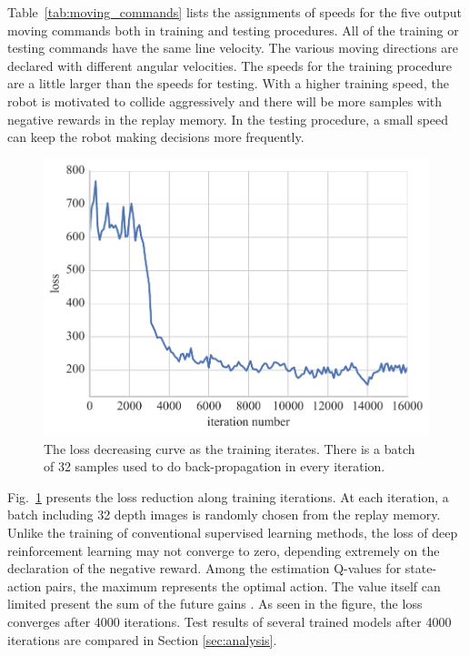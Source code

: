 Table~\ref{tab:moving_commands} lists the assignments of speeds for the five output moving commands both in training and testing procedures. All of the training or testing commands have the same line velocity. The various moving directions are declared with different angular velocities. The speeds for the training procedure are a little larger than the speeds for testing. With a higher training speed, the robot is motivated to collide aggressively and there will be more samples with negative rewards in the replay memory. In the testing procedure, a small speed can keep the robot making decisions more frequently.

   \begin{figure}[!ht]
      \centering
      \includegraphics[width=0.8\columnwidth]{figure/obstacle_figs/loss_decrease}
      \caption{The loss decreasing curve as the training iterates. There is a batch of 32 samples used to do back-propagation in every iteration.}
      \label{fig:training_loss}
   \end{figure}

Fig.~\ref{fig:training_loss} presents the loss reduction along training iterations. At each iteration, a batch including 32 depth images is randomly chosen from the replay memory. Unlike the training of conventional supervised learning methods, the loss of deep reinforcement learning may not converge to zero, depending extremely on the declaration of the negative reward. Among the estimation Q-values for state-action pairs, the maximum represents the optimal action. The value itself can limited present the sum of the future gains \cite{mnih2015human}. As seen in the figure, the loss converges after 4000 iterations. Test results of several trained models after 4000 iterations are compared in Section \ref{sec:analysis}.


